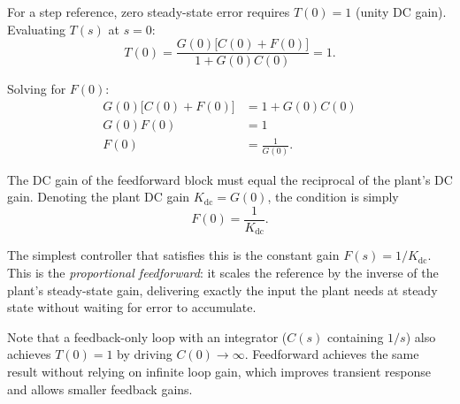 \documentclass[11pt]{article}
\begin{document}
For a step reference, zero steady-state error requires $T(0) = 1$ (unity DC
gain).  Evaluating $T(s)$ at $s=0$:
\[
  T(0) = \frac{G(0)\bigl[C(0)+F(0)\bigr]}{1+G(0)C(0)} = 1.
\]

Solving for $F(0)$:
\begin{align*}
  G(0)\bigl[C(0)+F(0)\bigr] &= 1 + G(0)C(0) \\
  G(0)F(0)                  &= 1             \\
  F(0)                      &= \frac{1}{G(0)}.
\end{align*}

The DC gain of the feedforward block must equal the reciprocal of the plant's
DC gain.  Denoting the plant DC gain $K_{\mathrm{dc}} = G(0)$, the condition is simply
\[
  \boxed{F(0) = \frac{1}{K_{\mathrm{dc}}}.}
\]

The simplest controller that satisfies this is the constant gain $F(s) = 1/K_{\mathrm{dc}}$.
This is the \emph{proportional feedforward}: it scales the reference by the
inverse of the plant's steady-state gain, delivering exactly the input the
plant needs at steady state without waiting for error to accumulate.

Note that a feedback-only loop with an integrator ($C(s)$ containing $1/s$)
also achieves $T(0)=1$ by driving $C(0)\to\infty$.  Feedforward achieves the
same result without relying on infinite loop gain, which improves transient
response and allows smaller feedback gains.
\end{document}
